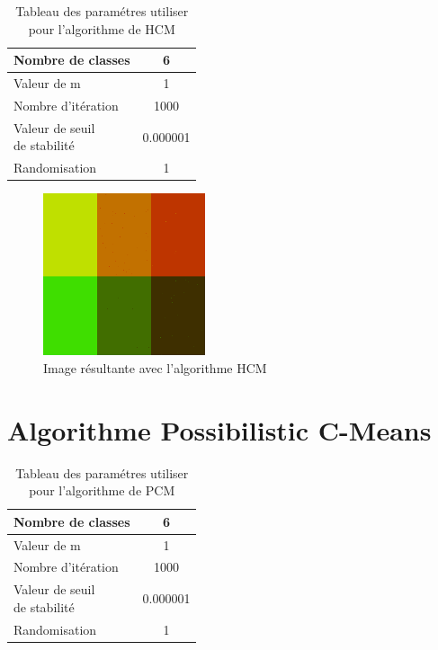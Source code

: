 \documentclass[a4paper,11pt]{article}
\begin{document}
\begin{table}[H]
  \begin{center}
    \begin{tabular}{|l|c|}
      \hline
      Nombre de classes & 6 \\
      \hline
      Valeur de m & 1 \\
      \hline
      Nombre d'itération & 1000 \\
      \hline
      \shortstack{ Valeur de seuil \\ de stabilité }  & 0.000001 \\
      \hline
      Randomisation & 1 \\
      \hline
    \end{tabular}
    \caption{Tableau des paramétres utiliser pour l'algorithme de HCM}
  \end{center}
\end{table}


\begin{figure}[H]
  \begin{center} 
    \includegraphics[width=180px]{../img/segHCM.png}
    \caption{Image résultante avec l'algorithme HCM}
  \end{center}
\end{figure}

\section{Algorithme Possibilistic C-Means}

\begin{table}[H]
  \begin{center}
    \begin{tabular}{|l|c|}
      \hline
      Nombre de classes & 6 \\
      \hline
      Valeur de m & 1 \\
      \hline
      Nombre d'itération & 1000 \\
      \hline
      \shortstack{ Valeur de seuil \\ de stabilité }  & 0.000001 \\
      \hline
      Randomisation & 1 \\
      \hline
    \end{tabular}
    \caption{Tableau des paramétres utiliser pour l'algorithme de PCM}
  \end{center}
\end{table}
\end{document}

